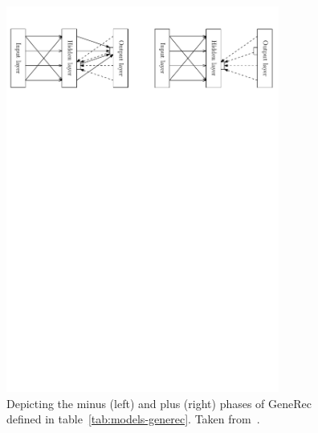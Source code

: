 \begin{figure}[H]
  \centering
  \includegraphics[width=0.8\textwidth]{img/models-generec-phase.pdf}
  
  \caption{Depicting the minus (left) and plus (right) phases of GeneRec defined in table~\ref{tab:models-generec}. Taken from~\citet{orru2008sabio}.} 
  \label{fig:models-generec-phase}
\end{figure}

